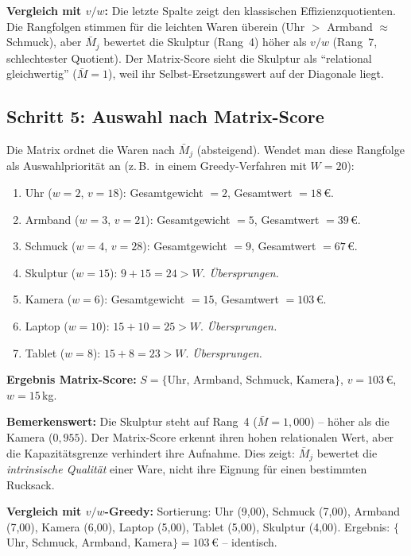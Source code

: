\documentclass[a4paper,11pt]{article}
\begin{document}
\medskip
\noindent
\textbf{Vergleich mit $v/w$:}
Die letzte Spalte zeigt den klassischen Effizienzquotienten.
Die Rangfolgen stimmen für die leichten Waren überein
(Uhr $>$ Armband $\approx$ Schmuck), aber $\bar{M}_j$ bewertet
die Skulptur (Rang~4) höher als $v/w$ (Rang~7, schlechtester
Quotient). Der Matrix-Score sieht die Skulptur als ``relational
gleichwertig'' ($\bar{M}=1$), weil ihr Selbst-Ersetzungswert
auf der Diagonale liegt.

\subsection{Schritt 5: Auswahl nach Matrix-Score}

Die Matrix ordnet die Waren nach $\bar{M}_j$ (absteigend).
Wendet man diese Rangfolge als Auswahlpriorität an
(z.\,B.\ in einem Greedy-Verfahren mit $W=20$):
\begin{enumerate}[topsep=2pt]
  \item Uhr ($w=2$, $v=18$): Gesamtgewicht $= 2$, Gesamtwert $= 18$\,\euro.
  \item Armband ($w=3$, $v=21$): Gesamtgewicht $= 5$, Gesamtwert $= 39$\,\euro.
  \item Schmuck ($w=4$, $v=28$): Gesamtgewicht $= 9$, Gesamtwert $= 67$\,\euro.
  \item Skulptur ($w=15$): $9 + 15 = 24 > W$. \textit{Übersprungen.}
  \item Kamera ($w=6$): Gesamtgewicht $= 15$, Gesamtwert $= 103$\,\euro.
  \item Laptop ($w=10$): $15 + 10 = 25 > W$. \textit{Übersprungen.}
  \item Tablet ($w=8$): $15 + 8 = 23 > W$. \textit{Übersprungen.}
\end{enumerate}

\noindent
\textbf{Ergebnis Matrix-Score:}
$S = \{\text{Uhr, Armband, Schmuck, Kamera}\}$,
$v = 103$\,\euro, $w = 15$\,kg.

\medskip
\noindent
\textbf{Bemerkenswert:} Die Skulptur steht auf Rang~4
($\bar{M} = 1{,}000$) -- höher als die Kamera ($0{,}955$).
Der Matrix-Score erkennt ihren hohen relationalen Wert,
aber die Kapazitätsgrenze verhindert ihre Aufnahme.
Dies zeigt: $\bar{M}_j$ bewertet die \emph{intrinsische Qualität}
einer Ware, nicht ihre Eignung für einen bestimmten Rucksack.

\medskip
\noindent
\textbf{Vergleich mit $v/w$-Greedy:}
Sortierung: Uhr (9{,}00), Schmuck (7{,}00), Armband (7{,}00),
Kamera (6{,}00), Laptop (5{,}00), Tablet (5{,}00), Skulptur (4{,}00).
Ergebnis: $\{$Uhr, Schmuck, Armband, Kamera$\} = 103$\,\euro{} --
identisch.
\end{document}
